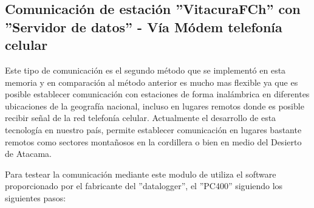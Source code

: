 \subsection{Comunicación de estación ''VitacuraFCh'' con ''Servidor de datos'' - Vía Módem telefonía celular}
Este tipo de comunicación es el segundo método que se implementó en esta memoria y en comparación al método anterior es mucho mas flexible ya que es posible establecer comunicación con estaciones de forma inalámbrica en diferentes ubicaciones de la geografía nacional, incluso en lugares remotos donde es posible recibir señal de la red telefonía celular. Actualmente el desarrollo de esta tecnología en nuestro país, permite establecer comunicación en lugares bastante remotos como sectores montañosos en la cordillera o bien en medio del Desierto de Atacama.

Para testear la comunicación mediante este modulo de utiliza el software proporcionado por el fabricante del ''datalogger'', el ''PC400'' siguiendo los siguientes pasos:

